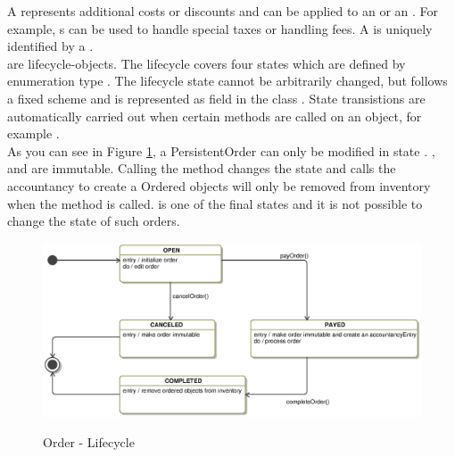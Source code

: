 A  represents additional costs or discounts and can be applied to an  or an . 
For example, s can be used to handle special taxes or handling fees.
A  is uniquely identified by a .
\\

 are lifecycle-objects.
The lifecycle covers four states which are defined by enumeration type .
The lifecycle state cannot be arbitrarily changed, but follows a fixed scheme and is represented as field  in the class .
State transistions are automatically carried out when certain methods are called on an  object, for example .
\\


As you can see in Figure \ref{order_statemachine}, a PersistentOrder can only be modified in state .
,  and   are immutable.
Calling the  method changes the state and calls the accountancy to create a 
Ordered objects will only be removed from inventory when the  method is called.  
 is one of the final states and it is not possible to change the state of such orders.
\\
\begin{figure}
	\centering
  \includegraphics[width=1.0\textwidth]{images/Order_StateMachine.eps}
  \label{order_statemachine}
	\caption{Order - Lifecycle}
\end{figure}  

